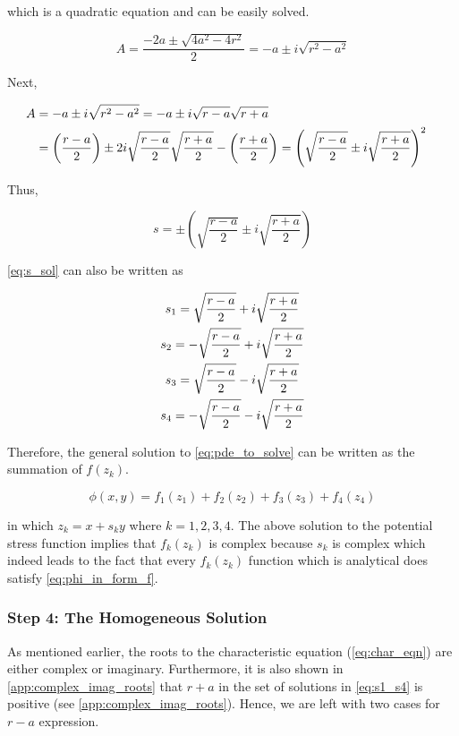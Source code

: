 \documentclass{article}
\begin{document}
which is a quadratic equation and can be easily solved.

\begin{equation*}
    A = \dfrac{-2a \pm \sqrt{4a^2 - 4r^2}}{2} = -a \pm i \sqrt{r^2 - a^2}
\end{equation*}

Next, 

\begin{align*}
    A &= -a \pm i \sqrt{r^2 - a^2} = -a \pm i \sqrt{r - a} \sqrt{r + a} &\notag \\
    & =\left(\dfrac{r-a}{2}\right) \pm 2i \sqrt{\dfrac{r-a}{2}} \sqrt{\dfrac{r+a}{2}} - \left(\dfrac{r+a}{2}\right) = \left(\sqrt{\dfrac{r-a}{2}} \pm i \sqrt{\dfrac{r+a}{2}} \right)^2 &
\end{align*}

Thus,

\begin{equation}
    s = \pm \left(\sqrt{\dfrac{r-a}{2}} \pm i \sqrt{\dfrac{r+a}{2}} \right)
    \label{eq:s_sol}
\end{equation}

\cref{eq:s_sol} can also be written as

\begin{gather}
    s_1 = \sqrt{\dfrac{r-a}{2}} + i \sqrt{\dfrac{r+a}{2}} \notag\\
    s_2 = -\sqrt{\dfrac{r-a}{2}} + i \sqrt{\dfrac{r+a}{2}} \notag\\
    s_3 = \sqrt{\dfrac{r-a}{2}} - i \sqrt{\dfrac{r+a}{2}} \notag\\
    s_4 = -\sqrt{\dfrac{r-a}{2}} - i \sqrt{\dfrac{r+a}{2}}
    \label{eq:s1_s4}
\end{gather}

Therefore, the general solution to \cref{eq:pde_to_solve} can be written as the summation of $f(z_k)$.

\begin{equation}
    \phi(x, y) = f_1(z_1) + f_2(z_2) + f_3(z_3) + f_4(z_4)
    \label{eq:phi_in_form_f}
\end{equation}

in which $z_k = x + s_k y $ where $k = 1, 2, 3, 4$. The above solution to the potential stress function implies that $f_k(z_k)$ is complex because $s_k$ is complex which indeed leads to the fact that every $f_k(z_k)$ function which is analytical does satisfy \cref{eq:phi_in_form_f}.

\subsubsection{Step 4: The Homogeneous Solution}
As mentioned earlier, the roots to the characteristic equation (\cref{eq:char_eqn}) are either complex or imaginary. Furthermore, it is also shown in \cref{app:complex_imag_roots} that $r+a$ in the set of solutions in \cref{eq:s1_s4} is positive (see \cref{app:complex_imag_roots}). Hence, we are left with two cases for $r-a$ expression.
\end{document}
